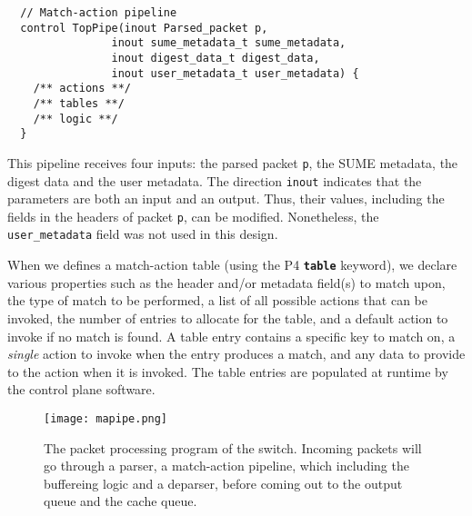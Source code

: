 {\renewcommand{\baselinestretch}{0.8}\small
	\begin{verbatim}
  // Match-action pipeline
  control TopPipe(inout Parsed_packet p,
                inout sume_metadata_t sume_metadata, 
                inout digest_data_t digest_data, 
                inout user_metadata_t user_metadata) {
    /** actions **/
    /** tables **/
    /** logic **/          
  }
	\end{verbatim}
}

This pipeline receives four inputs: the parsed packet \texttt{p}, the SUME metadata, the digest data and the user metadata. The direction \texttt{inout} indicates that the parameters are both an input and an output. Thus, their values, including the fields in the headers of packet \texttt{p}, can be modified. Nonetheless, the \verb|user_metadata| field was not used in this design.

When we defines a match-action table (using the P4 \textbf{\texttt{table}} keyword), we declare various properties such as the header and/or metadata field(s) to match upon, the type of match to be performed, a list of all possible actions that can be invoked, the number of entries to allocate for the table, and a default action to invoke if no match is found. A table entry contains a specific key to match on, a \textit{single} action to invoke when the entry produces a match, and any data to provide to the action when it is invoked. The table entries are populated at runtime by the control plane software.

\begin{figure}[!h]
	\centering
	\texttt{[image: mapipe.png]}
	\caption{The packet processing program of the switch. Incoming packets will go through a parser, a match-action pipeline, which including the buffereing logic and a deparser, before coming out to the output queue and the cache queue.}
	\label{fig:mapipe}
\end{figure}


